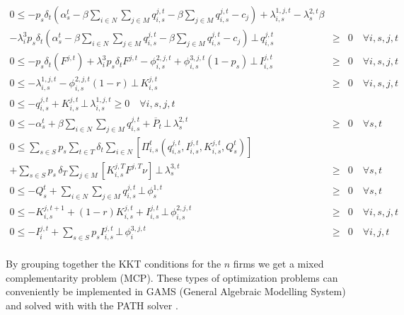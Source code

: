 \begin{align}
0\leq - p_s\delta_t\left(\alpha_s^t-\beta \sum_{i\in N}\sum_{j\in M} q_{i,s}^{j,t}-\beta\sum_{j\in M}q_{i,s}^{j,t}-c_j\right)+\lambda_{i,s}^{1,j,t} - \lambda_{s}^{2,t}\beta\nonumber\\ -\lambda_i^3p_s\delta_t\left(\alpha_s^t-\beta \sum_{i\in N}\sum_{j\in M} q_{i,s}^{j,t}-\beta\sum_{j\in M}q_{i,s}^{j,t}-c_j\right) \,\bot\, q_{i,s}^{j,t}&\geq& 0  \quad \forall i,s,j,t\\
0\leq - p_s\delta_t\left(F^{j,t}\right)+\lambda_i^3p_s\delta_tF^{j,t}- \phi_{i,s}^{2,j,t}+\phi_{i,s}^{3,j,t}\left(1-p_s\right)\,\bot\, I_{i,s}^{j,t}&\geq& 0  \quad \forall i,s,j,t\\
0 \leq -\lambda_{i,s}^{1,j,t}  -\phi_{i,s}^{2,j,t}(1-r) \,\bot\, K_{i,s}^{j,t}&\geq& 0  \quad \forall i,s,j,t\\
0\leq -q_{i,s}^{j,t} + K_{i,s}^{j,t} \,\bot\, \lambda_{i,s}^{1,j,t}\geq 0  \quad \forall i,s,j,t\\
0\leq -\alpha_s^t+\beta\sum_{i\in N}\sum_{j\in M}q_{i,s}^{j,t} + \overline{P}_t \,\bot\, \lambda_{s}^{2,t}&\geq& 0  \quad \forall s,t\\
0\leq  \sum_{s\in S}p_s \sum_{t\in T}\delta_t \sum_{i\in N}\left[\Pi_{i,s}^t\left(q_{i,s}^{j,t}, I_{i,s}^{j,t}, K_{i,s}^{j,t}, Q_s^t\right) \right ]\\
+ \sum_{s\in S}p_s\,\delta_T \sum_{j\in M}\left[K_{i,s}^{j,T}F^{j,T}\nu\right] \,\bot\, \lambda_{s}^{3,t}&\geq& 0  \quad \forall s,t\\
0 \leq -Q_s^t+\sum_{i\in N}\sum_{j\in M} q_{i,s}^{j,t} \,\bot\, \phi_{s}^{1,t}&\geq& 0  \quad \forall s,t\\
0 \leq -K_{i,s}^{j,t+1} + (1-r)K_{i,s}^{j,t}+I_{i,s}^{j,t} \,\bot\, \phi_{i,s}^{2,j,t}&\geq& 0  \quad \forall i,s,j,t\\
0 \leq -I_{i}^{j,t}+\sum_{s\in S}p_sI_{i,s}^{j,t} \,\bot\, \phi_{i}^{3,j,t}&\geq& 0  \quad \forall i,j,t\\
\end{align}








By grouping together the KKT conditions for the $n$ firms we get a mixed complementarity problem (MCP). These types of optimization problems can conveniently be implemented in GAMS (General Algebraic Modelling System) and solved with with the PATH solver \citep[see][]{Ferris2000}.

